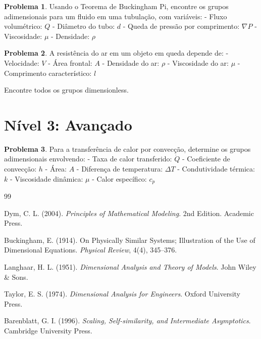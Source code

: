 \documentclass[12pt,a4paper,oneside]{book}
\theoremstyle{definition}
\newtheorem{problem}{Problema}
\begin{document}
\begin{problem}
Usando o Teorema de Buckingham Pi, encontre os grupos adimensionais para um fluido em uma tubulação, com variáveis:
- Fluxo volumétrico: $Q$
- Diâmetro do tubo: $d$
- Queda de pressão por comprimento: $\nabla P$
- Viscosidade: $\mu$
- Densidade: $\rho$
\end{problem}

\begin{problem}
A resistência do ar em um objeto em queda depende de:
- Velocidade: $V$
- Área frontal: $A$
- Densidade do ar: $\rho$
- Viscosidade do ar: $\mu$
- Comprimento característico: $l$

Encontre todos os grupos dimensionless.
\end{problem}

\section{Nível 3: Avançado}

\begin{problem}
Para a transferência de calor por convecção, determine os grupos adimensionais envolvendo:
- Taxa de calor transferido: $\dot{Q}$
- Coeficiente de convecção: $h$
- Área: $A$
- Diferença de temperatura: $\Delta T$
- Condutividade térmica: $k$
- Viscosidade dinâmica: $\mu$
- Calor específico: $c_p$
\end{problem}

\begin{thebibliography}{99}

 Dym, C. L. (2004). \textit{Principles of Mathematical Modeling}. 2nd Edition. Academic Press.

 Buckingham, E. (1914). On Physically Similar Systems; Illustration of the Use of Dimensional Equations. \textit{Physical Review}, 4(4), 345--376.

 Langhaar, H. L. (1951). \textit{Dimensional Analysis and Theory of Models}. John Wiley \& Sons.

 Taylor, E. S. (1974). \textit{Dimensional Analysis for Engineers}. Oxford University Press.

 Barenblatt, G. I. (1996). \textit{Scaling, Self-similarity, and Intermediate Asymptotics}. Cambridge University Press.

\end{thebibliography}
\end{document}
